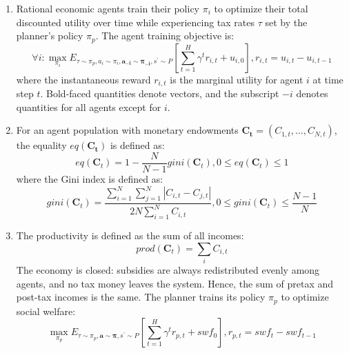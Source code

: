 \documentclass{article}
\begin{document}
\begin{enumerate}
	\item Rational economic agents train their policy \( \pi_{i} \) to optimize their total discounted utility over time while experiencing tax rates \( \tau \) set by the planner’s policy \( \pi_{p} \). The agent training objective is:
	\begin{equation}\label{Equation7}
		\forall i : \max_{\pi_{i}} E_{\tau \sim \pi_{p}, a_{i} \sim \pi_{i}, \mathbf{a_{-i}} \sim \mathbf{\pi_{-i}}, s^{'} \sim P} [\sum^{H}_{t = 1} \gamma^{t} r_{i, t} + u_{i, 0}], r_{i, t} = u_{i, t} - u_{i, t - 1}
	\end{equation}
	where the instantaneous reward \( r_{i, t} \) is the marginal utility for agent \( i \) at time step \( t \). Bold-faced quantities denote vectors, and the subscript \( -i \) denotes quantities for all agents except for \( i \).
	
	\item For an agent population with monetary endowments \( \mathbf{C_{t}} = (C_{1, t}, ..., C_{N, t}) \), the equality \( eq(\mathbf{C_{t}}) \) is defined as:
	\begin{equation}\label{Equation8}
		eq(\mathbf{C}_{t}) = 1 - \frac{N}{N - 1} gini(\mathbf{C}_{t}), 0 \leq eq(\mathbf{C}_{t}) \leq 1
	\end{equation}
	where the Gini index is defined as:
	\begin{equation}\label{Equation9}
		gini(\mathbf{C}_{t}) = \frac{\sum_{i = 1}^{N} \sum_{j = 1}^{N} |C_{i, t} - C_{j, t}|}{2N \sum^{N}_{i = 1} C_{i, t}}, 0 \leq gini(\mathbf{C}_{t}) \leq \frac{N - 1}{N}
	\end{equation}

	\item The productivity is defined as the sum of all incomes:
	\begin{equation}\label{Equation10}
		prod(\mathbf{C}_{t}) = \sum_{i} C_{i, t}
	\end{equation}
	The economy is closed: subsidies are always redistributed evenly among agents, and no tax money leaves the system. Hence, the sum of pretax and post-tax incomes is the same. The planner trains its policy \( \pi_{p} \) to optimize social welfare:
	\begin{equation}\label{Equation11}
		\max_{\pi_{p}} E_{\tau \sim \pi_{p}, \mathbf{a} \sim \mathbf{\pi}, s^{'} \sim P} [\sum^{H}_{t = 1} \gamma^{t} r_{p, t} + swf_{0}], r_{p, t} = swf_{t} - swf_{t - 1}
	\end{equation}


\end{enumerate}
\end{document}
